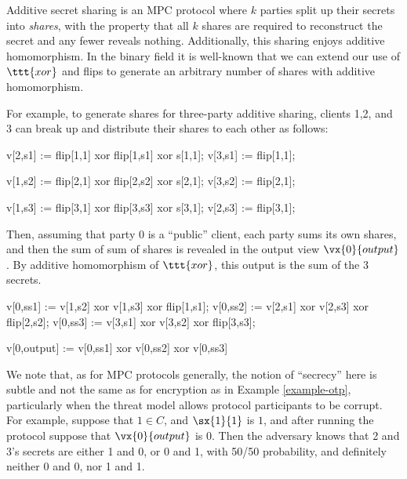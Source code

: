 \begin{example}
    \label{example-he}
Additive secret sharing is an MPC protocol where $k$ parties split up
their secrets into \emph{shares}, with the property that all $k$
shares are required to reconstruct the secret and any fewer reveals
nothing. Additionally, this sharing enjoys additive homomorphism. In
the binary field it is well-known that we can extend our use
of $\ttt{xor}$ and flips to generate an arbitrary number of shares
with additive homomorphism. 

For example, to generate shares for three-party additive sharing,
clients 1,2, and 3 can break up and distribute their shares to
each other as follows:
\begin{verbatimtab}
  v[2,s1] := flip[1,1] xor flip[1,s1] xor s[1,1];
  v[3,s1] := flip[1,1];

  v[1,s2] := flip[2,1] xor flip[2,s2] xor s[2,1];
  v[3,s2] := flip[2,1];

  v[1,s3] := flip[3,1] xor flip[3,s3] xor s[3,1];
  v[2,s3] := flip[3,1];
\end{verbatimtab}
Then, assuming that party 0 is a ``public'' client, each party sums
its own shares, and then the sum of sum of shares is revealed
in the output view $\vx{0}{output}$. By additive homomorphism of
$\ttt{xor}$, this output is the sum of the 3 secrets.
\begin{verbatimtab}
  v[0,ss1] := v[1,s2] xor v[1,s3] xor flip[1,s1];
  v[0,ss2] := v[2,s1] xor v[2,s3] xor flip[2,s2];
  v[0,ss3] := v[3,s1] xor v[3,s2] xor flip[3,s3];

  v[0,output] := v[0,ss1] xor v[0,ss2] xor v[0,ss3]
\end{verbatimtab}
We note that, as for MPC protocols generally, the notion of
``secrecy'' here is subtle and not the same as for encryption as in
Example \ref{example-otp}, particularly when the threat model allows
protocol participants to be corrupt. For example, suppose that $1 \in C$, and
$\sx{1}{1}$ is $1$, and after running the protocol suppose that
$\vx{0}{output}$ is 0. Then the adversary knows that 2 and 3's secrets
are either 1 and 0, or 0 and 1, with 50/50 probability, and definitely
neither 0 and 0, nor 1 and 1. 
\end{example}



